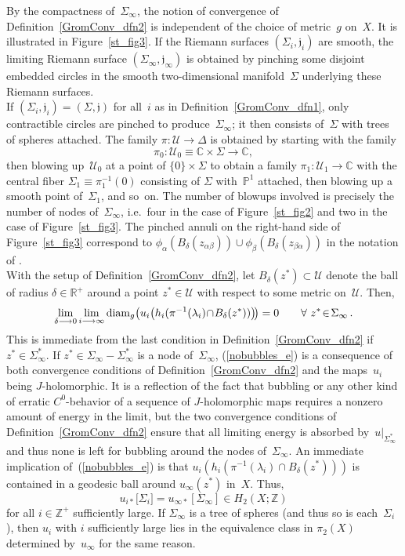 \documentclass[11pt]{article}
\numberwithin{equation}{section}
\theoremstyle{definition}
\def\BE#1{\begin{equation}\label{#1}}
\def\EE{\end{equation}}
\def\eref#1{(\ref{#1})}
\def\sf#1{\textsf{#1}}
\def\lra{\longrightarrow}
\def\C{\mathbb{C}}
\def\fj{\mathfrak j}
\def\P{\mathbb{P}}
\def\R{\mathbb R}
\def\cU{\mathcal U}
\def\Z{{\mathbb Z}}
\def\al{\alpha}
\def\be{\beta}
\def\de{\delta}
\def\la{\lambda}
\def\De{\Delta}
\def\Si{\Sigma}
\def\i{\infty}
\def\diam{\textnormal{diam}}
\begin{document}
\noindent
By the compactness of~$\Si_{\i}$, the notion of convergence of Definition~\ref{GromConv_dfn2}
is independent of the choice of metric~$g$ on~$X$.
It is illustrated in Figure~\ref{st_fig3}.
If the Riemann surfaces $(\Si_i,\fj_i)$ are smooth,
the limiting Riemann surface $(\Si_{\i},\fj_{\i})$ is obtained by pinching
some disjoint embedded circles in the smooth two-dimensional manifold~$\Si$
underlying these Riemann surfaces.\\

\noindent
If \hbox{$(\Si_i,\fj_i)\!=\!(\Si,\fj)$} for all~$i$ as in Definition~\ref{GromConv_dfn1},
only contractible circles are pinched to produce~$\Si_{\i}$;
it then consists of~$\Si$ with trees of spheres attached.
The family $\pi\!:\cU\!\lra\!\De$ is obtained by starting with the family
$$\pi_0\!:\cU_0\!\equiv\!\C\!\times\!\Si\lra\C,$$
then blowing up~$\cU_0$ at a point of $\{0\}\!\times\!\Si$ 
to obtain a family $\pi_1\!:\cU_1\!\lra\!\C$
with the central fiber \hbox{$\Si_1\!\equiv\!\pi_1^{-1}(0)$} consisting of $\Si$ with~$\P^1$ attached,
then blowing up a smooth point of~$\Si_1$, and so~on.
The number of blowups involved is precisely the number of nodes of~$\Si_{\i}$,
i.e.~four in the case of Figure~\ref{st_fig2} and two in the case of Figure~\ref{st_fig3}.
The pinched annuli on the right-hand side of Figure~\ref{st_fig3} correspond 
to $\phi_{\al}(B_{\de}(z_{\al\be}))\!\cup\!\phi_{\be}(B_{\de}(z_{\be\al}))$
in the notation of \cite[Chapters~4,5]{MS12}.\\

\noindent
With the setup of Definition~\ref{GromConv_dfn2}, let $B_{\de}(z^*)\!\subset\!\cU$
denote the ball of radius $\de\!\in\!\R^+$ around a point $z^*\!\in\!\cU$
with respect to some metric on~$\cU$.
Then,
\BE{nobubbles_e}\lim_{\de\lra0}\lim_{i\lra\i}\diam_g\big(
u_i\big(h_i(\pi^{-1}(\la_i)\!\cap\!B_{\de}(z^*))\big)\!\big)=0
\qquad\forall~z^*\!\in\!\Si_{\i}\,.\EE
This is immediate from the last condition in Definition~\ref{GromConv_dfn2} 
if $z^*\!\in\!\Si_{\i}^*$.
If $z^*\!\in\!\Si_{\i}\!-\!\Si_{\i}^*$ is a node of~$\Si_{\i}$, 
\eref{nobubbles_e} is a consequence of both convergence
conditions of Definition~\ref{GromConv_dfn2}  and the maps~$u_i$ being $J$-holomorphic.
It is a reflection of the fact that \sf{bubbling} or any other kind of erratic $C^0$-behavior
of a sequence of $J$-holomorphic maps requires a nonzero amount of energy in the limit,
but the two convergence conditions of Definition~\ref{GromConv_dfn2} ensure that 
all limiting energy is absorbed by~$u|_{\Si_{\i}^*}$ and thus none is left for bubbling
around the nodes of~$\Si_{\i}$.
An immediate implication of~\eref{nobubbles_e} is that 
$u_i(h_i(\pi^{-1}(\la_i)\!\cap\!B_{\de}(z^*)))$ is contained in a geodesic ball
around $u_{\i}(z^*)$ in~$X$.
Thus,
$$u_{i*}\big[\Si_i\big]=u_{\i*}[\Si_{\i}]\in H_2(X;\Z)$$
for all $i\!\in\!\Z^+$ sufficiently large.
If $\Si_{\i}$ is a tree of spheres (and thus so is each~$\Si_i$),
then $u_i$ with $i$ sufficiently large lies in the equivalence class
in $\pi_2(X)$ determined by~$u_{\i}$ for the same reason.
\end{document}
